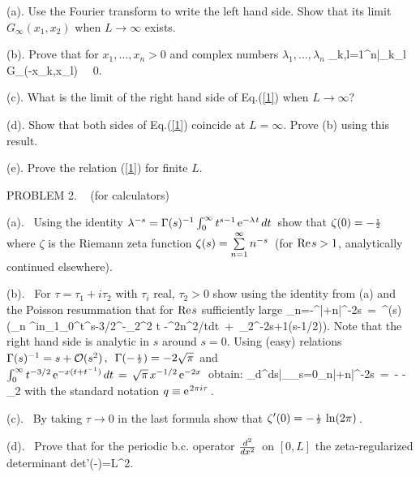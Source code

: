 \no (a). Use the Fourier transform to write the left hand side.
Show that its limit $G_\infty(x_1,x_2)$ when $L\to\infty$ exists. 
\vskip 0.2cm

\no (b). Prove that for $x_1,\dots,x_n>0$ and complex numbers
$\lambda_1,\dots,\lambda_n$
\vskip 0.2cm
\qq
\sum\limits_{k,l=1}^n\bar\lambda_k\s\lambda_l \s\s G_\infty(-x_k,x_l)
\ \geq\ 0\s.
\non
\qqq

\no (c). What is the limit of the right hand side of Eq.\s\s(\ref{1})
when $L\to\infty$?
\vskip 0.2cm

\no (d). Show that both sides of Eq.\s\s(\ref{1}) coincide at $L=\infty$. 
Prove (b) using this result.
\vskip 0.2cm

\no (e). Prove the relation (\ref{1}) for finite $L$.
\vskip 1cm


\no PROBLEM 2. \ {} (for calculators)
\vskip 0.4cm

\no (a). \ Using the identity \s$\lambda^{-s}=\Gamma(s)^{-1}\int_0^\infty
t^{s-1}\hspace{0.05cm}{\rm e}^{-\lambda\hspace{0.025cm} t}\hspace{0.05cm} dt\hspace{0.05cm}$ show that \s$\zeta(0)=-{_1\over^2}$
where $\zeta$ is the Riemann zeta function \s$\zeta(s)=
\sum\limits_{n=1}^\infty n^{-s}\hspace{0.05cm}$ (for \s${\rm Re}\hspace{0.025cm} s>1$,
analytically continued elsewhere).
\vskip 0.2cm

\no (b). \ For $\tau=\tau_1+i\tau_2$ with $\tau_i$ real, $\tau_2>0$
show using the identity from (a) and the Poisson resummation
that for ${\rm Re}\hspace{0.025cm} s$ sufficiently large
\qq
\sum\limits_{n=-\infty}^\infty|\tau+n|^{-2s}\ =\ 
{\sqrt{_\pi}\over^{\Gamma(s)}}\left(\sum\limits_{n}
\ee^{\pi in\tau_1}\int_0^\infty t^{s-3/2}\s\m\ee^{-\tau_2^2 t
-\pi^2n^2/t}\s\s dt\ +\ \tau_2^{-2s+1}\s\Gamma(s-1/2)\right)\s.
\non
\qqq
Note that the right hand side is analytic in $s$ around $s=0$.
Using (easy) relations \s$\Gamma(s)^{-1}=s+{\cal O}(s^2)\hspace{0.05cm},$\ \s$
\Gamma(-\hspace{0.025cm}{_1\over^2})=-2\sqrt{\pi}\hspace{0.05cm}$ and
\s$\int_0^\infty t^{-3/2}\hspace{0.05cm}{\rm e}^{-x(t+t^{-1})}\hspace{0.05cm} dt\hspace{0.05cm}=\hspace{0.05cm}\sqrt{\pi}\hspace{0.05cm} 
x^{-1/2}\hspace{0.05cm}{\rm e}^{-2x}\hspace{0.05cm}$ obtain:
\qq
{_d\over^{ds}}\bigg|_{_{s=0}}\sum\limits_n|\tau+n|^{-2s}\ =\ -\s
\ln{|1-q|^2}\s-\s 2\pi\tau_2
\non
\qqq
with the standard notation \s$q\equiv{\rm e}^{\hspace{0.025cm} 2\pi i\tau}\hspace{0.05cm}$.
\vskip 0.1cm

\no (c). \ By taking $\tau\to 0$ in the last formula show that
 \s$\zeta'(0)=-\hspace{0.025cm}{_1\over^2}\hspace{0.05cm}\ln(2\pi)\hspace{0.05cm}$. 
\vskip 0.2cm

\no (d). \ Prove that for the periodic b.c. operator 
\s${{d^2}\over{dx^2}}\hspace{0.05cm}$ on $[0,L]$ the zeta-regularized
determinant 
\qq
{\rm det}'(-\m{_\beta\over^{2\pi}})\s=\pi L^2\s.
\non
\qqq
\vskip 0.2cm


